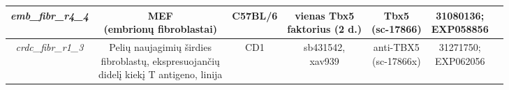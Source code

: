 \documentclass[12pt]{article}
\begin{document}
\begin{table}[htb]
\begin{tabular}{|c|c|c|c|c|c|c|}
    \hline
    \emph{emb\_fibr\_r4\_4} & \thead{MEF\\ (embrionų fibroblastai)} & C57BL/6 &
                \thead{vienas Tbx5\\ faktorius (2 d.)} & \thead{Tbx5\\ (sc-17866)} &
                \thead{31080136\cite{ARTCL2};\\EXP058856}\\
    \hline
    \emph{crdc\_fibr\_r1\_3} & \thead{Pelių naujagimių širdies\\ fibroblastų, 
                ekspresuojančių\\ didelį kiekį T antigeno, linija} & CD1 &
                \thead{sb431542,\\ xav939} & \thead{anti-TBX5\\ (sc-17866x)} &
                \thead{31271750\cite{ARTCL3};\\EXP062056}\\
    \hline
    
    \end{tabular}
\end{table}

\newpage
\end{document}
